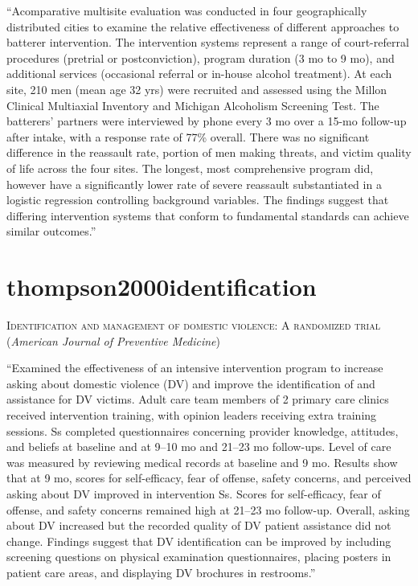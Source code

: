 \documentclass[]{tufte-handout}
\begin{document}
``Acomparative multisite evaluation was conducted in four geographically
distributed cities to examine the relative effectiveness of different
approaches to batterer intervention. The intervention systems represent
a range of court-referral procedures (pretrial or postconviction),
program duration (3 mo to 9 mo), and additional services (occasional
referral or in-house alcohol treatment). At each site, 210 men (mean age
32 yrs) were recruited and assessed using the Millon Clinical Multiaxial
Inventory and Michigan Alcoholism Screening Test. The batterers'
partners were interviewed by phone every 3 mo over a 15-mo follow-up
after intake, with a response rate of 77\% overall. There was no
significant difference in the reassault rate, portion of men making
threats, and victim quality of life across the four sites. The longest,
most comprehensive program did, however have a significantly lower rate
of severe reassault substantiated in a logistic regression controlling
background variables. The findings suggest that differing intervention
systems that conform to fundamental standards can achieve similar
outcomes.''

\section{\texorpdfstring{\textcolor[HTML]{5b0057}{thompson2000identification}}{}}\label{section-2}

\textsc{\large{Identification and management of domestic violence: A randomized trial}}
(\emph{American Journal of Preventive Medicine})

``Examined the effectiveness of an intensive intervention program to
increase asking about domestic violence (DV) and improve the
identification of and assistance for DV victims. Adult care team members
of 2 primary care clinics received intervention training, with opinion
leaders receiving extra training sessions. Ss completed questionnaires
concerning provider knowledge, attitudes, and beliefs at baseline and at
9--10 mo and 21--23 mo follow-ups. Level of care was measured by
reviewing medical records at baseline and 9 mo. Results show that at 9
mo, scores for self-efficacy, fear of offense, safety concerns, and
perceived asking about DV improved in intervention Ss. Scores for
self-efficacy, fear of offense, and safety concerns remained high at
21--23 mo follow-up. Overall, asking about DV increased but the recorded
quality of DV patient assistance did not change. Findings suggest that
DV identification can be improved by including screening questions on
physical examination questionnaires, placing posters in patient care
areas, and displaying DV brochures in restrooms.''
\end{document}
